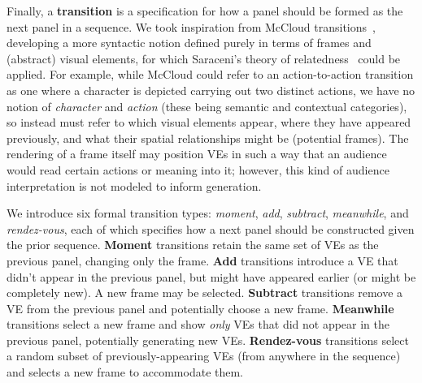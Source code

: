 Finally, a {\bf transition} is a specification for how a panel should be
formed as the next panel in a sequence.
%
We took inspiration from McCloud
transitions~\cite{mcCloud1993understanding}, developing a more
syntactic notion  defined purely in terms of frames and (abstract) visual
elements, for which Saraceni's theory of
relatedness~\cite{saraceni2016relatedness} could be applied. For example,
while McCloud could refer to an action-to-action transition as one where a
character is depicted carrying out two distinct actions, we have no notion
of {\em character} and {\em action} (these being semantic and contextual
categories), so instead must refer to which visual elements appear, where
they have appeared previously, and what their spatial relationships might
be (potential frames). The rendering of a frame itself may position VEs in
such a way that an audience would read certain actions or meaning into it;
however, this kind of audience interpretation is not modeled to inform
generation.


We introduce six formal transition types: {\em moment}, {\em add}, {\em
subtract}, {\em meanwhile}, and {\em rendez-vous}, each of which specifies
how a next panel should be constructed given the prior sequence.
{\bf Moment} transitions retain the same set of VEs as the previous panel, 
changing only the frame.
{\bf Add} transitions introduce a VE that didn't appear in the
previous panel, but might have appeared earlier (or might be completely
new). A new frame may be selected.
{\bf Subtract} transitions remove a VE from the previous panel and
potentially choose a new frame.
{\bf Meanwhile} transitions select a new frame and show {\em only}
VEs that did not appear in the previous panel, potentially generating new
VEs.
{\bf Rendez-vous} transitions select a random subset of
previously-appearing VEs (from anywhere in the sequence) and selects a new
frame to accommodate them.

